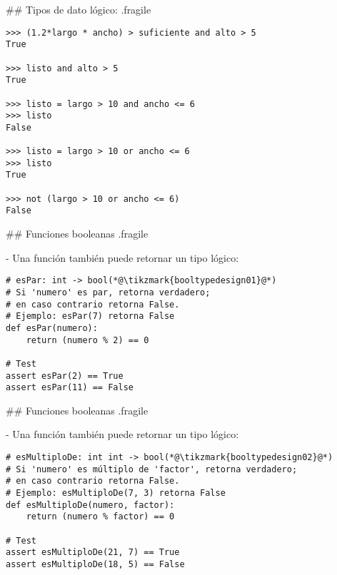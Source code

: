 \trmcolumns


## Tipos de dato lógico: {.fragile}


\begin{lstlisting}
>>> (1.2*largo * ancho) > suficiente and alto > 5
True

>>> listo and alto > 5
True

>>> listo = largo > 10 and ancho <= 6
>>> listo
False

>>> listo = largo > 10 or ancho <= 6
>>> listo
True

>>> not (largo > 10 or ancho <= 6)
False
\end{lstlisting}

## Funciones booleanas {.fragile}

- Una función también puede retornar un tipo lógico:

\begin{lstlisting}[style=frame02]
# esPar: int -> bool(*@\tikzmark{booltypedesign01}@*)
# Si 'numero' es par, retorna verdadero;
# en caso contrario retorna False.
# Ejemplo: esPar(7) retorna False
def esPar(numero):
    return (numero % 2) == 0

# Test
assert esPar(2) == True
assert esPar(11) == False
\end{lstlisting}

\pause


## Funciones booleanas {.fragile}

- Una función también puede retornar un tipo lógico:

\begin{lstlisting}[style=frame02]
# esMultiploDe: int int -> bool(*@\tikzmark{booltypedesign02}@*)
# Si 'numero' es múltiplo de 'factor', retorna verdadero;
# en caso contrario retorna False.
# Ejemplo: esMultiploDe(7, 3) retorna False
def esMultiploDe(numero, factor):
    return (numero % factor) == 0

# Test
assert esMultiploDe(21, 7) == True
assert esMultiploDe(18, 5) == False
\end{lstlisting}

